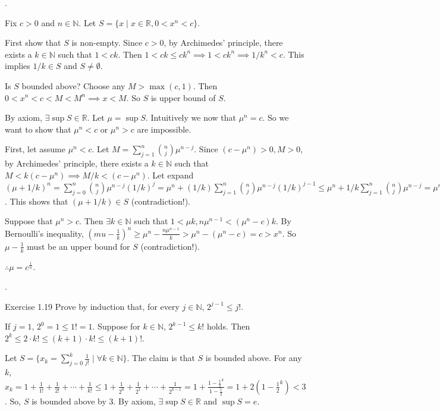 \documentclass[8pt]{beamer}
\newcommand{\mbb}[1]{\mathbb{#1}}
\begin{document}
\begin{frame}{.}
    \begin{example}
        Fix $c>0$ and $n \in \mbb{N}$.
        Let $S = \{x \mid x \in \mbb{R}, 0 <x^n <c \}$.

        First show that $S$ is non-empty.
        Since $c >0$, by Archimedes' principle, there exists a $k \in \mbb{N}$ such that $1 < ck$.
        Then $1 < ck \leq ck^n \implies 1 < ck^n \implies 1/k^n < c$.
        This implies $1/k \in S$ and $S \neq \emptyset$.

        Is $S$ bounded above?
        Choose any $M > \max (c,1)$.
        Then $0 < x^n < c < M < M^n \implies x < M$.
        So $S$ is upper bound of $S$.

        By axiom, $\exists \sup S \in \mbb{R}$.
        Let $\mu = \sup S$.
        Intuitively we now that $\mu^n = c$.
        So we want to show that $\mu^n < c$ or $\mu^n >c$ are impossible.

        First, let assume $\mu^n < c$.
        Let $M = \sum_{j=1}^n \binom{n}{j} \mu^{n-j}$.
        Since $(c - \mu^n) >0, M >0$, by Archimedes' principle, there exists a $k \in \mbb{N}$ such that $M < k (c - \mu^n) \implies M/k < (c - \mu^n)$.
        Let expand $(\mu + 1/k)^n = \sum_{j=0}^n \binom{n}{j} \mu^{n-j} (1/k)^j = \mu^n + (1/k)\sum_{j=1}^n \binom{n}{j} \mu^{n-j} (1/k)^{j-1} \leq \mu^n + 1/k \sum_{j=1}^n \binom{n}{j} \mu^{n-j} = \mu^n + M/k \leq \mu^n + (c - \mu^n) =c$.
        This shows that $(\mu + 1/k) \in S$ (contradiction!).
        
        Suppose that $\mu^n > c$. Then $\exists k \in \mbb{N}$  such that $1 < \mu k, n \mu^{n-1} < (\mu^n -c) k$. By Bernoulli's inequality, $(mu - \frac{1}{k})^n \geq \mu^n - \frac{n \mu^{n-1}}{k} > \mu^n - (\mu^n - c) = c > x^n$.
        So $\mu - \frac{1}{k}$ must be an upper bound for $S$ (contradiction!).

        $\therefore \mu = c^{\frac{1}{n}}$.
    \end{example}
\end{frame}

\begin{frame}{.}
    \begin{block}{Exercise 1.19}
        Prove by induction that, for every $j \in \mbb{N}$, $2^{j-1} \leq j!$.

        If $j=1$, $2^0 = 1 \leq 1! = 1$.
        Suppose for $k \in \mbb{N}$, $2^{k-1} \leq k!$ holds.
        Then $2^k \leq 2 \cdot k! \leq (k+1)\cdot k! \leq (k+1)!$.
    \end{block}


    \begin{example}
        Let $S = \{x_k = \sum_{j=0}^k \frac{1}{j!} \mid \forall k \in \mbb{N}\}$.
        The claim is that $S$ is bounded above.
        For any $k$, $x_k = 1 + \frac{1}{1!} + \frac{1}{2!} + \cdots + \frac{1}{k!} \leq 1 + \frac{1}{2^0} + \frac{1}{2^1} + \cdots + \frac{1}{2^{k-1}} = 1 + \frac{1 - \frac{1}{2}^k}{1 - \frac{1}{2}} = 1 + 2\left(1 - \frac{1}{2}^k\right) <3$.
        So, $S$ is bounded above by $3$.
        By axiom, $\exists \sup S \in \mbb{R}$ and $\sup S = e$.
    \end{example}
\end{frame}
\end{document}
